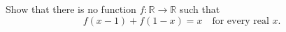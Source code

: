 Show that there is no function $f:\mathbb{R}\to\mathbb{R}$ such that
\[
f(x-1)+f(1-x)=x\quad\text{for every real }x.
\]
